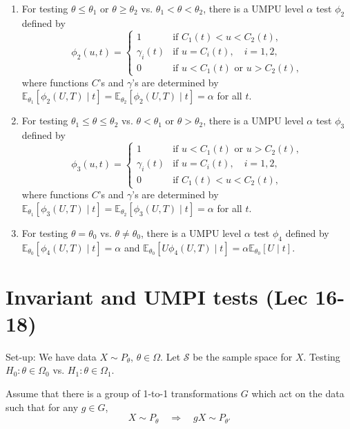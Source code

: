\documentclass[twoside]{article}
\newcommand\bbE{\mathbb{E}}
\newcommand\Om{\Omega}
\def\t{\theta}
\begin{document}
\begin{itemize}
\begin{enumerate}[label=(\roman*)]
\item For testing $\t \leq \t_1$ or $\t \geq \t_2$ vs. $\t_1 < \t < \t_2$, there is a UMPU level $\alpha$ test $\phi_2$ defined by
\begin{equation*} \phi_2(u,t) = \begin{cases} 1 &\text{if } C_1(t) < u < C_2(t), \\ 
\gamma_i(t) &\text{if } u = C_i(t), \quad i = 1,2, \\
0 &\text{if } u < C_1(t) \text{ or } u > C_2(t),
\end{cases}  \end{equation*}
where functions $C$'s and $\gamma$'s are determined by $\bbE_{\t_1}[\phi_2(U,T)\mid t] = \bbE_{\t_2}[\phi_2(U,T)\mid t] = \alpha$ for all $t$.

\item For testing $\t_1 \leq \t \leq \t_2$ vs. $\t < \t_1$ or $\t > \t_2$, there is a UMPU level $\alpha$ test $\phi_3$ defined by
\begin{equation*} \phi_3(u,t) = \begin{cases} 1 &\text{if } u < C_1(t) \text{ or } u > C_2(t), \\ 
\gamma_i(t) &\text{if } u = C_i(t), \quad i = 1,2, \\
0 &\text{if } C_1(t) < u < C_2(t),
\end{cases}  \end{equation*}
where functions $C$'s and $\gamma$'s are determined by $\bbE_{\t_1}[\phi_3(U,T)\mid t] = \bbE_{\t_2}[\phi_3(U,T)\mid t] = \alpha$ for all $t$.

\item For testing $\t = \t_0$ vs. $\t \neq \t_0$, there is a UMPU level $\alpha$ test $\phi_4$ defined by $\bbE_{\t_0}[\phi_4(U,T) \mid t] = \alpha$ and $\bbE_{\t_0}[U \phi_4 (U,T) \mid t] = \alpha \bbE_{\t_0}[U \mid t]$.

\end{enumerate}

\end{itemize}

\section*{Invariant and UMPI tests (Lec 16-18)}
Set-up: We have data $X \sim P_\t$, $\t \in \Om$. Let $\mathcal{S}$ be the sample space for $X$. Testing $H_0: \t \in \Om_0$ vs. $H_1: \t \in \Om_1$.

Assume that there is a group of 1-to-1 transformations $G$ which act on the data such that for any $g \in G$, 
\begin{equation*} X \sim P_\t \quad \Rightarrow \quad gX \sim P_{\t'} \end{equation*}
\end{document}

